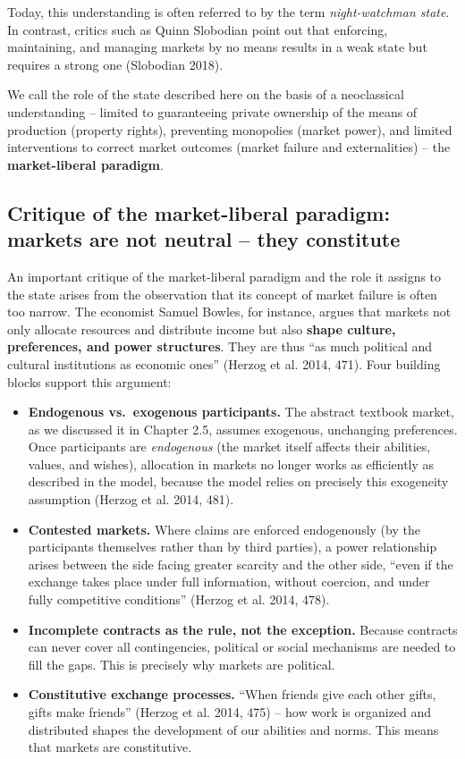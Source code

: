 \documentclass[
  british,
  a4paper,
  DIV=11,
  numbers=noendperiod,
  oneside,
  openany]{scrreprt}
\providecommand{\tightlist}{%
  \setlength{\itemsep}{0pt}\setlength{\parskip}{0pt}}
\begin{document}
Today, this understanding is often referred to by the term
\emph{night-watchman state}. In contrast, critics such as Quinn
Slobodian point out that enforcing, maintaining, and managing markets by
no means results in a weak state but requires a strong one (Slobodian
2018).

We call the role of the state described here on the basis of a
neoclassical understanding -- limited to guaranteeing private ownership
of the means of production (property rights), preventing monopolies
(market power), and limited interventions to correct market outcomes
(market failure and externalities) -- the \textbf{market-liberal
paradigm}.

\subsection{Critique of the market-liberal paradigm: markets are not
neutral -- they
constitute}\label{critique-of-the-market-liberal-paradigm-markets-are-not-neutral-they-constitute}

An important critique of the market-liberal paradigm and the role it
assigns to the state arises from the observation that its concept of
market failure is often too narrow. The economist Samuel Bowles, for
instance, argues that markets not only allocate resources and distribute
income but also \textbf{shape culture, preferences, and power
structures}. They are thus ``as much political and cultural institutions
as economic ones'' (Herzog et al. 2014, 471). Four building blocks
support this argument:

\begin{itemize}
\tightlist
\item
  \textbf{Endogenous vs.~exogenous participants.} The abstract textbook
  market, as we discussed it in Chapter 2.5, assumes exogenous,
  unchanging preferences. Once participants are \emph{endogenous} (the
  market itself affects their abilities, values, and wishes), allocation
  in markets no longer works as efficiently as described in the model,
  because the model relies on precisely this exogeneity assumption
  (Herzog et al. 2014, 481).
\item
  \textbf{Contested markets.} Where claims are enforced endogenously (by
  the participants themselves rather than by third parties), a power
  relationship arises between the side facing greater scarcity and the
  other side, ``even if the exchange takes place under full information,
  without coercion, and under fully competitive conditions'' (Herzog et
  al. 2014, 478).
\item
  \textbf{Incomplete contracts as the rule, not the exception.} Because
  contracts can never cover all contingencies, political or social
  mechanisms are needed to fill the gaps. This is precisely why markets
  are political.
\item
  \textbf{Constitutive exchange processes.} ``When friends give each
  other gifts, gifts make friends'' (Herzog et al. 2014, 475) -- how
  work is organized and distributed shapes the development of our
  abilities and norms. This means that markets are constitutive.
\end{itemize}
\end{document}

